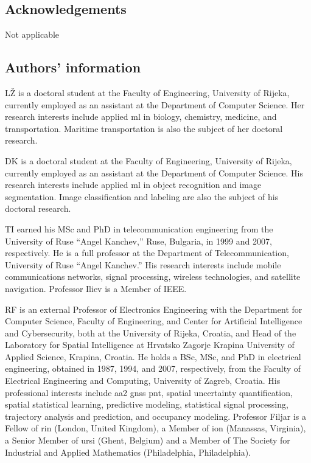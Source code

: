 \documentclass[sn-mathphys-num]{sn-jnl}%
\begin{document}
\subsection{Acknowledgements}

Not applicable

\subsection{Authors' information}

LŽ is a doctoral student at the Faculty of Engineering, University of Rijeka, currently employed as an assistant at the Department of Computer Science. Her research interests include applied \acrlong{ml} in biology, chemistry, medicine, and transportation. Maritime transportation is also the subject of her doctoral research.

DK is a doctoral student at the Faculty of Engineering, University of Rijeka, currently employed as an assistant at the Department of Computer Science. His research interests include applied \acrlong{ml} in object recognition and image segmentation. Image classification and labeling are also the subject of his doctoral research.

TI earned his MSc and PhD in telecommunication engineering from the University of Ruse “Angel Kanchev,” Ruse, Bulgaria, in 1999 and 2007, respectively. He is a full professor at the Department of Telecommunication, University of Ruse “Angel Kanchev.” His research interests include mobile communications networks, signal processing, wireless technologies, and satellite navigation. Professor Iliev is a Member of IEEE.

RF is an external Professor of Electronics Engineering with the Department for Computer Science, Faculty of Engineering, and Center for Artificial Intelligence and Cybersecurity, both at the University of Rijeka, Croatia, and Head of the Laboratory for Spatial Intelligence at Hrvatsko Zagorje Krapina University of Applied Science, Krapina, Croatia. He holds a BSc, MSc, and PhD in electrical engineering, obtained in 1987, 1994, and 2007, respectively, from the Faculty of Electrical Engineering and Computing, University of Zagreb, Croatia. His professional interests include \acrfull{aa2} \acrfull{gnss} \acrfull{pnt}, spatial uncertainty quantification, spatial statistical learning, predictive modeling, statistical signal processing, trajectory analysis and prediction, and occupancy modeling. Professor Filjar is a Fellow of \acrfull{rin} (London, United Kingdom), a Member of \acrfull{ion} (Manassas, Virginia), a Senior Member of \acrfull{ursi} (Ghent, Belgium) and a Member of The Society for Industrial and Applied Mathematics  (Philadelphia, Philadelphia). %
\end{document}
